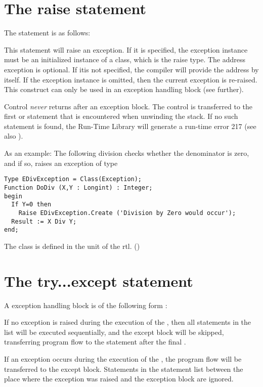 \documentclass{report}
\begin{document}
\section{The raise statement}
The  statement is as follows:

This statement will raise an exception. If it is specified, the exception
instance must be an initialized instance of a class, which is the raise
type. The address exception is optional. If itis not specified, the compiler
will provide the address by itself.
If the exception instance is omitted, then the current exception is
re-raised. This construct can only be used in an exception handling
block (see further).

\begin{remark} Control {\em never} returns after an exception block. The
control is transferred to the first  or
 statement that is encountered when unwinding the stack.
If no such statement is found, the \fpc Run-Time Library will generate a
run-time error 217 (see also ).
\end{remark}

As an example: The following division checks whether the denominator is
zero, and if so, raises an exception of type 
\begin{verbatim}
Type EDivException = Class(Exception);
Function DoDiv (X,Y : Longint) : Integer;
begin
  If Y=0 then
    Raise EDivException.Create ('Division by Zero would occur');
  Result := X Div Y;
end;
\end{verbatim}
The class  is defined in the  unit of the rtl.
()

\section{The try...except statement}
A  exception handling block is of the following form :

If no exception is raised during the execution of the ,
then all statements in the list will be executed sequentially, and the
except block will be skipped, transferring program flow to the statement
after the final .

If an exception occurs during the execution of the , the
program flow will be transferred to the except block. Statements in the
statement list between the place where the exception was raised and the
exception block are ignored.
\end{document}
